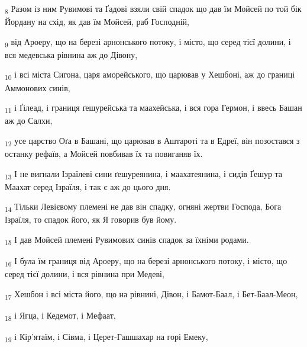 \begin{tcolorbox}
\textsubscript{8} Разом із ним Рувимові та Ґадові взяли свій спадок що дав їм Мойсей по той бік Йордану на схід, як дав їм Мойсей, раб Господній,
\end{tcolorbox}
\begin{tcolorbox}
\textsubscript{9} від Ароеру, що на березі арнонського потоку, і місто, що серед тієї долини, і вся медевська рівнина аж до Дівону,
\end{tcolorbox}
\begin{tcolorbox}
\textsubscript{10} і всі міста Сигона, царя аморейського, що царював у Хешбоні, аж до границі Аммонових синів,
\end{tcolorbox}
\begin{tcolorbox}
\textsubscript{11} і Ґілеад, і границя ґешурейська та маахейська, і вся гора Гермон, і ввесь Башан аж до Салхи,
\end{tcolorbox}
\begin{tcolorbox}
\textsubscript{12} усе царство Оґа в Башані, що царював в Аштароті та в Едреї, він позостався з останку рефаїв, а Мойсей повбивав їх та повиганяв їх.
\end{tcolorbox}
\begin{tcolorbox}
\textsubscript{13} І не вигнали Ізраїлеві сини ґешуреянина, і маахатеянина, і сидів Ґешур та Маахат серед Ізраїля, і так є аж до цього дня.
\end{tcolorbox}
\begin{tcolorbox}
\textsubscript{14} Тільки Левієвому племені не дав він спадку, огняні жертви Господа, Бога Ізраїля, то спадок його, як Я говорив був йому.
\end{tcolorbox}
\begin{tcolorbox}
\textsubscript{15} І дав Мойсей племені Рувимових синів спадок за їхніми родами.
\end{tcolorbox}
\begin{tcolorbox}
\textsubscript{16} І була їм границя від Ароеру, що на березі арнонського потоку, і місто, що серед тієї долини, і вся рівнина при Медеві,
\end{tcolorbox}
\begin{tcolorbox}
\textsubscript{17} Хешбон і всі міста його, що на рівнині, Дівон, і Бамот-Баал, і Бет-Баал-Меон,
\end{tcolorbox}
\begin{tcolorbox}
\textsubscript{18} і Ягца, і Кедемот, і Мефаат,
\end{tcolorbox}
\begin{tcolorbox}
\textsubscript{19} і Кір'ятаїм, і Сівма, і Церет-Гашшахар на горі Емеку,
\end{tcolorbox}

